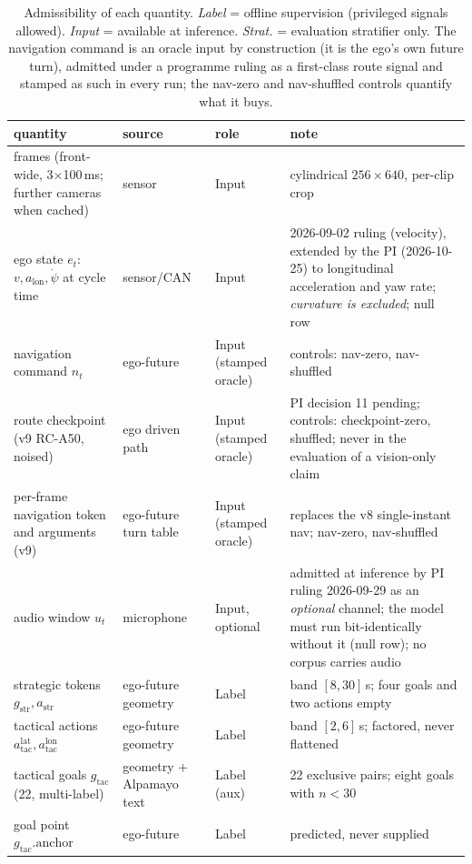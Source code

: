 \begin{table}[t]
\centering\footnotesize
\caption{Admissibility of each quantity. \emph{Label} = offline supervision (privileged signals allowed). \emph{Input} = available at inference.
\emph{Strat.} = evaluation stratifier only. The navigation command is an oracle input by construction (it is the ego's own future turn), admitted under
a programme ruling as a first-class route signal and stamped as such in every run; the nav-zero and nav-shuffled controls quantify what it buys.}
\label{tab:inputs}
\begin{tabular}{@{}p{4.6cm}p{2.5cm}p{2.7cm}p{5.0cm}@{}}
\toprule
quantity & source & role & note \\ \midrule
frames (front-wide, 3$\times$100\,ms; further cameras when cached) & sensor & Input & cylindrical $256\times640$, per-clip crop \\
ego state $e_t$: $v,a_{\text{lon}},\dot\psi$ at cycle time & sensor/CAN & Input & 2026-09-02 ruling (velocity), extended by the PI (2026-10-25) to longitudinal acceleration and yaw rate; \emph{curvature is excluded}; null row \\
navigation command $n_t$ & ego-future & Input (stamped oracle) & controls: nav-zero, nav-shuffled \\
route checkpoint (v9 RC-A50, noised) & ego driven path & Input (stamped oracle) & PI decision 11 pending; controls: checkpoint-zero, shuffled; never in the evaluation of a vision-only claim \\
per-frame navigation token and arguments (v9) & ego-future turn table & Input (stamped oracle) & replaces the v8 single-instant nav; nav-zero, nav-shuffled \\
audio window $u_t$ & microphone & Input, optional & admitted at inference by PI ruling 2026-09-29 as an \emph{optional} channel; the model must run bit-identically without it (null row); no corpus carries audio \\
strategic tokens $g_{\text{str}},a_{\text{str}}$ & ego-future geometry & Label & band $[8,30]$\,s; four goals and two actions empty \\
tactical actions $a_{\text{tac}}^{\text{lat}},a_{\text{tac}}^{\text{lon}}$ & ego-future geometry & Label & band $[2,6]$\,s; factored, never flattened \\
tactical goals $g_{\text{tac}}$ (22, multi-label) & geometry + Alpamayo text & Label (aux) & 22 exclusive pairs; eight goals with $n<30$ \\
goal point $g_{\text{tac}}.\text{anchor}$ & ego-future & Label & predicted, never supplied \\

\end{tabular}
\end{table}
